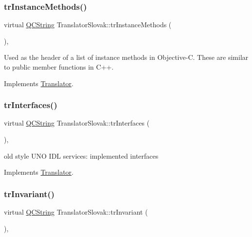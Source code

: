 \subsubsection{\texorpdfstring{trInstanceMethods()}{trInstanceMethods()}}
{\footnotesize\ttfamily virtual \mbox{\hyperlink{class_q_c_string}{Q\+C\+String}} Translator\+Slovak\+::tr\+Instance\+Methods (\begin{DoxyParamCaption}{ }\end{DoxyParamCaption})\hspace{0.3cm}{\ttfamily [inline]}, {\ttfamily [virtual]}}

Used as the header of a list of instance methods in Objective-\/C. These are similar to public member functions in C++. 

Implements \mbox{\hyperlink{class_translator}{Translator}}.

\mbox{\label{class_translator_slovak_a7ee75ce63e4e59ca0108f3bc4eae0ab8}} 
\subsubsection{\texorpdfstring{trInterfaces()}{trInterfaces()}}
{\footnotesize\ttfamily virtual \mbox{\hyperlink{class_q_c_string}{Q\+C\+String}} Translator\+Slovak\+::tr\+Interfaces (\begin{DoxyParamCaption}{ }\end{DoxyParamCaption})\hspace{0.3cm}{\ttfamily [inline]}, {\ttfamily [virtual]}}

old style U\+NO I\+DL services\+: implemented interfaces 

Implements \mbox{\hyperlink{class_translator}{Translator}}.

\mbox{\label{class_translator_slovak_a62ad6855636231e24f9518d264c374d0}} 
\subsubsection{\texorpdfstring{trInvariant()}{trInvariant()}}
{\footnotesize\ttfamily virtual \mbox{\hyperlink{class_q_c_string}{Q\+C\+String}} Translator\+Slovak\+::tr\+Invariant (\begin{DoxyParamCaption}{ }\end{DoxyParamCaption})\hspace{0.3cm}{\ttfamily [inline]}, {\ttfamily [virtual]}}

